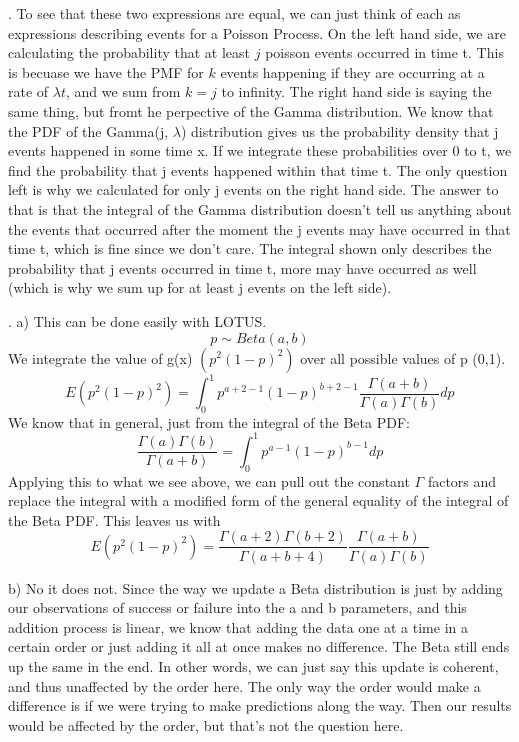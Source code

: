 \documentclass[11pt]{article}
\begin{document}
. 
\smallskip	To see that these two expressions are equal, we can just think of each as expressions describing events for a Poisson Process.  On the left hand side, we are calculating the probability that at least $j$ poisson events occurred in time t.  This is becuase we have the PMF for $k$ events happening if they are occurring at a rate of $\lambda t$, and we sum from $k=j$ to infinity. The right hand side is saying the same thing, but fromt he perpective of the Gamma distribution.  We know that the PDF of the Gamma(j, $\lambda$) distribution gives us the probability density that j events happened in some time x.  If we integrate these probabilities over 0 to t, we find the probability that j events happened within that time t.  The only question left is why we calculated for only j events on the right hand side.  The answer to that is that the integral of the Gamma distribution doesn't tell us anything about the events that occurred after the moment the j events may have occurred in that time t, which is fine since we don't care.  The integral shown only describes the probability that j events occurred in time t, more may have occurred as well (which is why we sum up for at least j events on the left side).
\smallskip
	
\bigskip


. 
	a) This can be done easily with LOTUS.  
	$$ p \sim Beta(a,b) $$
	We integrate the value of g(x) $(p^2(1-p)^2)$ over all possible values of p (0,1).
	$$ E(p^2(1-p)^2) = \int^1_0p^{a+2-1}(1-p)^{b+2-1}\frac{\Gamma(a+b)}{\Gamma(a)\Gamma(b)}dp$$
	We know that in general, just from the integral of the Beta PDF:
	$$ \frac{\Gamma(a)\Gamma(b)}{\Gamma(a+b)} = \int^1_0 p^{a-1}(1-p)^{b-1}dp$$
	Applying this to what we see above, we can pull out the constant $\Gamma$ factors and replace the integral with a modified form of the general equality of the integral of the Beta PDF. This leaves us with 
	$$ \boxed{E(p^2(1-p)^2) = \frac{\Gamma(a+2)\Gamma(b+2)}{\Gamma(a+b+4)}\frac{\Gamma(a+b)}{\Gamma(a)\Gamma(b)}}$$

\smallskip

	b) No it does not.  Since the way we update a Beta distribution is just by adding our observations of success or failure into the a and b parameters, and this addition process is linear, we know that adding the data one at a time in a certain order or just adding it all at once makes no difference.  The Beta still ends up the same in the end. In other words, we can just say this update is coherent, and thus unaffected by the order here.  
	The only way the order would make a difference is if we were trying to make predictions along the way.  Then our results would be affected by the order, but that's not the question here. 
\end{document}
